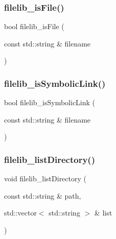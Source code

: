 \mbox{\label{namespaceplatform_aca0d9e2b4896bfd0f7a5cd64049188fc}} 
\subsubsection{\texorpdfstring{filelib\+\_\+is\+File()}{filelib\_isFile()}}
{\footnotesize\ttfamily bool filelib\+\_\+is\+File (\begin{DoxyParamCaption}\item[{const std\+::string \&}]{filename }\end{DoxyParamCaption})}

\mbox{\label{namespaceplatform_a69dc63b6fb991650c05dde15b04ca465}} 
\subsubsection{\texorpdfstring{filelib\+\_\+is\+Symbolic\+Link()}{filelib\_isSymbolicLink()}}
{\footnotesize\ttfamily bool filelib\+\_\+is\+Symbolic\+Link (\begin{DoxyParamCaption}\item[{const std\+::string \&}]{filename }\end{DoxyParamCaption})}

\mbox{\label{namespaceplatform_acad9142fb05b5756d75b8f8a68b5558b}} 
\subsubsection{\texorpdfstring{filelib\+\_\+list\+Directory()}{filelib\_listDirectory()}}
{\footnotesize\ttfamily void filelib\+\_\+list\+Directory (\begin{DoxyParamCaption}\item[{const std\+::string \&}]{path,  }\item[{std\+::vector$<$ std\+::string $>$ \&}]{list }\end{DoxyParamCaption})}

